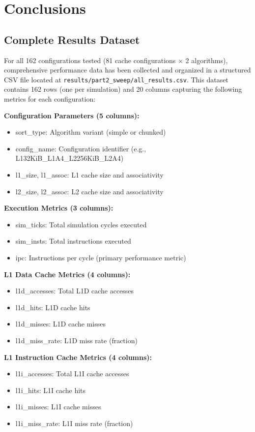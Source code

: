 \documentclass[12pt,a4paper]{article}
\begin{document}
\section{Conclusions}

\subsection{Complete Results Dataset}

For all 162 configurations tested (81 cache configurations $\times$ 2 algorithms), comprehensive performance data has been collected and organized in a structured CSV file located at \texttt{results/part2\_sweep/all\_results.csv}. This dataset contains 162 rows (one per simulation) and 20 columns capturing the following metrics for each configuration:

\textbf{Configuration Parameters (5 columns):}
\begin{itemize}
    \item sort\_type: Algorithm variant (simple or chunked)
    \item config\_name: Configuration identifier (e.g., L132KiB\_L1A4\_L2256KiB\_L2A4)
    \item l1\_size, l1\_assoc: L1 cache size and associativity
    \item l2\_size, l2\_assoc: L2 cache size and associativity
\end{itemize}

\textbf{Execution Metrics (3 columns):}
\begin{itemize}
    \item sim\_ticks: Total simulation cycles executed
    \item sim\_insts: Total instructions executed
    \item ipc: Instructions per cycle (primary performance metric)
\end{itemize}

\textbf{L1 Data Cache Metrics (4 columns):}
\begin{itemize}
    \item l1d\_accesses: Total L1D cache accesses
    \item l1d\_hits: L1D cache hits
    \item l1d\_misses: L1D cache misses
    \item l1d\_miss\_rate: L1D miss rate (fraction)
\end{itemize}

\textbf{L1 Instruction Cache Metrics (4 columns):}
\begin{itemize}
    \item l1i\_accesses: Total L1I cache accesses
    \item l1i\_hits: L1I cache hits
    \item l1i\_misses: L1I cache misses
    \item l1i\_miss\_rate: L1I miss rate (fraction)
\end{itemize}
\end{document}
